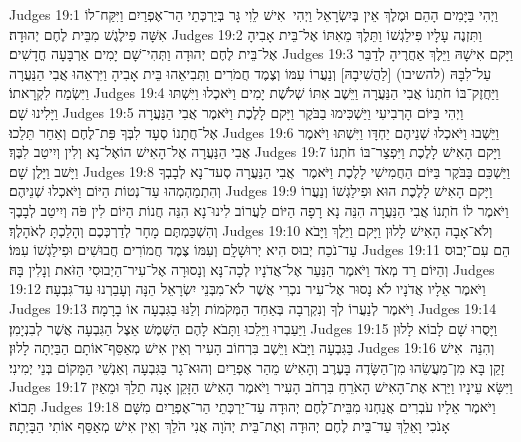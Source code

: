 Judges 19:1	וַיְהִי בַּיָּמִים הָהֵם וּמֶלֶךְ אֵין בְּיִשְׂרָאֵל וַיְהִי  אִישׁ לֵוִי גָּר בְּיַרְכְּתֵי הַר־אֶפְרַיִם וַיִּקַּח־לוֹ אִשָּׁה פִילֶגֶשׁ מִבֵּית לֶחֶם יְהוּדָה׃
Judges 19:2	וַתִּזְנֶה עָלָיו פִּילַגְשׁוֹ וַתֵּלֶךְ מֵאִתּוֹ אֶל־בֵּית אָבִיהָ אֶל־בֵּית לֶחֶם יְהוּדָה וַתְּהִי־שָׁם יָמִים אַרְבָּעָה חֳדָשִׁים׃
Judges 19:3	וַיָּקם אִישָׁהּ וַיֵּלֶךְ אַחֲרֶיהָ לְדַבֵּר עַל־לִבָּהּ (להשיבו) [לַהֲשִׁיבָהּ] וְנַעֲרוֹ עִמּוֹ וְצֶמֶד חֲמֹרִים וַתְּבִיאֵהוּ בֵּית אָבִיהָ וַיִּרְאֵהוּ אֲבִי הַנַּעֲרָה וַיִּשְׂמַח לִקְרָאתוֹ׃
Judges 19:4	וַיַּחֲזֶק־בּוֹ חֹתְנוֹ אֲבִי הַנַּעֲרָה וַיֵּשֶׁב אִתּוֹ שְׁלֹשֶׁת יָמִים וַיֹּאכְלוּ וַיִּשְׁתּוּ וַיָּלִינוּ שָׁם׃
Judges 19:5	וַיְהִי בַּיּוֹם הָרְבִיעִי וַיַּשְׁכִּימוּ בַבֹּקֶר וַיָּקם לָלֶכֶת וַיֹּאמֶר אֲבִי הַנַּעֲרָה אֶל־חֲתָנוֹ סְעָד לִבְּךָ פַּת־לֶחֶם וְאַחַר תֵּלֵכוּ׃
Judges 19:6	וַיֵּשְׁבוּ וַיֹּאכְלוּ שְׁנֵיהֶם יַחְדָּו וַיִּשְׁתּוּ וַיֹּאמֶר אֲבִי הַנַּעֲרָה אֶל־הָאִישׁ הוֹאֶל־נָא וְלִין וְיִיטַב לִבֶּךָ׃
Judges 19:7	וַיָּקם הָאִישׁ לָלֶכֶת וַיִּפְצַר־בּוֹ חֹתְנוֹ וַיָּשׁב וַיָּלֶן שָׁם׃
Judges 19:8	וַיַּשְׁכֵּם בַּבֹּקֶר בַּיּוֹם הַחֲמִישִׁי לָלֶכֶת וַיֹּאמֶר  אֲבִי הַנַּעֲרָה סְעד־נָא לְבָבְךָ וְהִתְמַהְמְהוּ עַד־נְטוֹת הַיּוֹם וַיֹּאכְלוּ שְׁנֵיהֶם׃
Judges 19:9	וַיָּקם הָאִישׁ לָלֶכֶת הוּא וּפִילַגְשׁוֹ וְנַעֲרוֹ וַיֹּאמֶר לוֹ חֹתְנוֹ אֲבִי הַנַּעֲרָה הִנֵּה נָא רָפָה הַיּוֹם לַעֲרוֹב לִינוּ־נָא הִנֵּה חֲנוֹת הַיּוֹם לִין פֹּה וְיִיטַב לְבָבֶךָ וְהִשְׁכַּמְתֶּם מָחָר לְדַרְכְּכֶם וְהָלַכְתָּ לְאֹהָלֶךָ׃
Judges 19:10	וְלֹא־אָבָה הָאִישׁ לָלוּן וַיָּקם וַיֵּלֶךְ וַיָּבֹא עַד־נֹכַח יְבוּס הִיא יְרוּשָׁלָ͏ִם וְעִמּוֹ צֶמֶד חֲמוֹרִים חֲבוּשִׁים וּפִילַגְשׁוֹ עִמּוֹ׃
Judges 19:11	הֵם עִם־יְבוּס וְהַיּוֹם רַד מְאֹד וַיֹּאמֶר הַנַּעַר אֶל־אֲדֹנָיו לְכָה־נָּא וְנָסוּרָה אֶל־עִיר־הַיְבוּסִי הַזֹּאת וְנָלִין בָּהּ׃
Judges 19:12	וַיֹּאמֶר אֵלָיו אֲדֹנָיו לֹא נָסוּר אֶל־עִיר נכְרִי אֲשֶׁר לֹא־מִבְּנֵי יִשְׂרָאֵל הֵנָּה וְעָבַרְנוּ עַד־גִּבְעָה׃
Judges 19:13	וַיֹּאמֶר לְנַעֲרוֹ לְךָ וְנִקְרְבָה בְּאַחַד הַמְּקֹמוֹת וְלַנּוּ בַגִּבְעָה אוֹ בָרָמָה׃
Judges 19:14	וַיַּעַבְרוּ וַיֵּלֵכוּ וַתָּבֹא לָהֶם הַשֶּׁמֶשׁ אֵצֶל הַגִּבְעָה אֲשֶׁר לְבִנְיָמִן׃
Judges 19:15	וַיָּסֻרוּ שָׁם לָבוֹא לָלוּן בַּגִּבְעָה וַיָּבֹא וַיֵּשֶׁב בִּרְחוֹב הָעִיר וְאֵין אִישׁ מְאַסֵּף־אוֹתָם הַבַּיְתָה לָלוּן׃
Judges 19:16	וְהִנֵּה  אִישׁ זָקֵן בָּא מִן־מַעֲשֵׂהוּ מִן־הַשָּׂדֶה בָּעֶרֶב וְהָאִישׁ מֵהַר אֶפְרַיִם וְהוּא־גָר בַּגִּבְעָה וְאַנְשֵׁי הַמָּקוֹם בְּנֵי יְמִינִי׃
Judges 19:17	וַיִּשָּׂא עֵינָיו וַיַּרְא אֶת־הָאִישׁ הָאֹרֵחַ בִּרְחֹב הָעִיר וַיֹּאמֶר הָאִישׁ הַזָּקֵן אָנָה תֵלֵךְ וּמֵאַיִן תָּבוֹא׃
Judges 19:18	וַיֹּאמֶר אֵלָיו עֹבְרִים אֲנַחְנוּ מִבֵּית־לֶחֶם יְהוּדָה עַד־יַרְכְּתֵי הַר־אֶפְרַיִם מִשָּׁם אָנֹכִי וָאֵלֵךְ עַד־בֵּית לֶחֶם יְהוּדָה וְאֶת־בֵּית יְהֹוָה אֲנִי הֹלֵךְ וְאֵין אִישׁ מְאַסֵּף אוֹתִי הַבָּיְתָה׃

